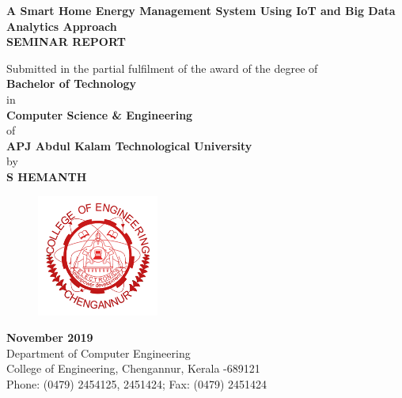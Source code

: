\documentclass[a4paper,12pt,oneside]{article}
\begin{document}
\thispagestyle{empty}
\begin{center}

\large{\textbf{{A Smart Home Energy Management System
Using IoT and Big Data Analytics Approach}}}
\setlength{\baselineskip}{1.5\baselineskip}
\\
\vspace{5mm}
\textbf{SEMINAR REPORT}

Submitted in the partial fulfilment of the award of the degree
of
\\
\textbf{Bachelor of Technology}
\\
in
\\
\textbf{Computer Science \& Engineering}
\\
of
\\
\textbf{APJ Abdul Kalam Technological University}
\\
by
\\
\textbf{S HEMANTH}
\\
\vspace{5mm}
\begin{figure}[H]
\centering
\includegraphics[width=4cm]{ceclogo.png}
\end{figure}
\textbf{November 2019}
\vspace{8mm}
\\
Department of Computer Engineering
\\
College of Engineering, Chengannur, Kerala -689121
\\
Phone: (0479) 2454125, 2451424; Fax: (0479) 2451424
\\
\end{center}
\end{document}
